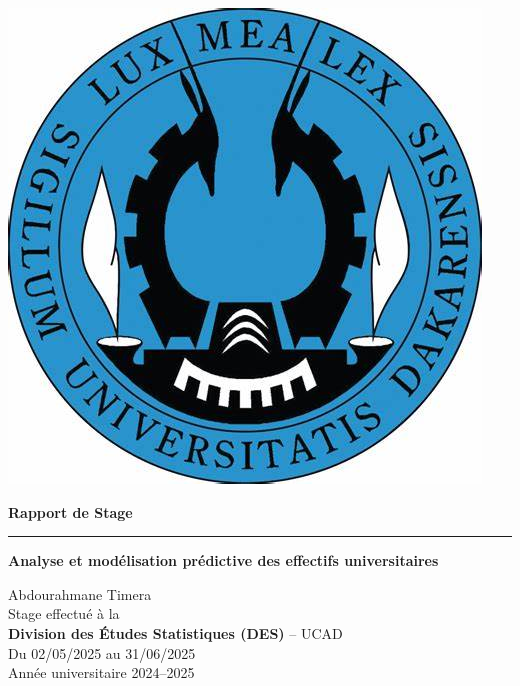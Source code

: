 \documentclass{article}
\begin{document}
\begin{tcolorbox}[colframe=myblue, colback=white, boxrule=1pt, arc=4pt, width=\textwidth, left=0pt, right=0pt, top=2pt, bottom=2pt]
\begin{minipage}{0.18\textwidth}
        \includegraphics[width=\textwidth]{image/ucad.jpg}
    \end{minipage}
\end{tcolorbox} 

\vspace{1cm}

\begin{center}
    {\fontsize{38}{44}\selectfont\bfseries Rapport de Stage}\\[1em]
    \color{myblue}\rule{0.6\textwidth}{3pt}
\end{center}

\vspace{1cm} 

\begin{center}
    {\fontsize{24}{24}\selectfont\bfseries Analyse et modélisation prédictive des effectifs universitaires}\\[1em]
\end{center}

\vspace{1cm} 

\begin{center}
    {\fontsize{20}{24}\selectfont Abdourahmane Timera}\\[1em]
    {\fontsize{16}{20}\selectfont
        Stage effectué à la\\
        \textbf{Division des Études Statistiques (DES)} – UCAD\\[0.8em]
        Du 02/05/2025 au 31/06/2025\\[0.8em]
        Année universitaire 2024–2025
    }
\end{center}
\end{document}
